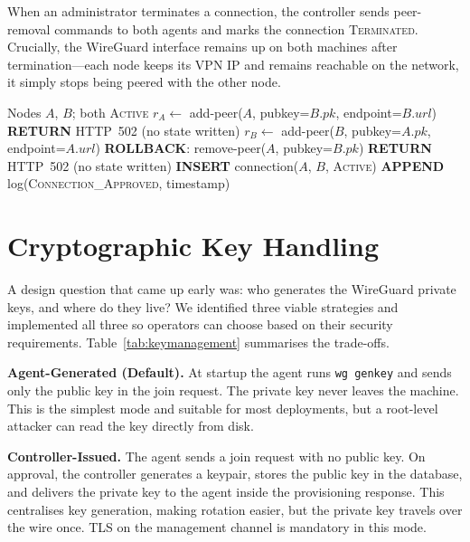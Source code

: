 \documentclass[conference]{IEEEtran}
\begin{document}
When an administrator terminates a connection, the controller sends
peer-removal commands to both agents and marks the connection
\textsc{Terminated}. Crucially, the WireGuard interface remains up on both
machines after termination---each node keeps its VPN IP and remains reachable
on the network, it simply stops being peered with the other node.

\begin{algorithm}[!t]
\caption{Peer Connection Approval}
\label{alg:conn_approval}
\begin{algorithmic}[1]
\REQUIRE Nodes $A$, $B$; both \textsc{Active}
\STATE $r_A \leftarrow$ add-peer($A$, pubkey=$B.\textit{pk}$, endpoint=$B.\textit{url}$)
  \STATE \textbf{RETURN} HTTP~502 (no state written)
\ENDIF
\STATE $r_B \leftarrow$ add-peer($B$, pubkey=$A.\textit{pk}$, endpoint=$A.\textit{url}$)
  \STATE \textbf{ROLLBACK}: remove-peer($A$, pubkey=$B.\textit{pk}$)
  \STATE \textbf{RETURN} HTTP~502 (no state written)
\ENDIF
\STATE \textbf{INSERT} connection($A$, $B$, \textsc{Active})
\STATE \textbf{APPEND} log(\textsc{Connection\_Approved}, timestamp)
\end{algorithmic}
\end{algorithm}


\section{Cryptographic Key Handling}
\label{sec:keymanagement}

A design question that came up early was: who generates the WireGuard private
keys, and where do they live? We identified three viable strategies and
implemented all three so operators can choose based on their security
requirements. Table~\ref{tab:keymanagement} summarises the trade-offs.

\textbf{Agent-Generated (Default).} At startup the agent runs \texttt{wg
genkey} and sends only the public key in the join request. The private key
never leaves the machine. This is the simplest mode and suitable for most
deployments, but a root-level attacker can read the key directly from disk.

\textbf{Controller-Issued.} The agent sends a join request with no public
key. On approval, the controller generates a keypair, stores the public key
in the database, and delivers the private key to the agent inside the
provisioning response. This centralises key generation, making rotation
easier, but the private key travels over the wire once. TLS on the
management channel is mandatory in this mode.
\end{document}
